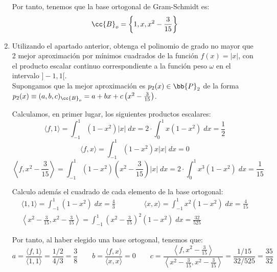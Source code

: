 \begin{ejercicio}
\begin{enumerate}
        Por tanto, tenemos que la base ortogonal de Gram-Schmidt es:
        \begin{equation*}
            \cc{B}_o = \left\{1,x,x^2 -\frac{3}{15}\right\}
        \end{equation*}

        \item Utilizando el apartado anterior, obtenga el polinomio de grado no mayor que 2 mejor aproximación por mínimos cuadrados de la función $f(x) = |x|$, con el producto escalar continuo correspondiente a la función peso $\omega$ en el intervalo $]-1, 1[$.\\

        Supongamos que la mejor aproximación es $p_2(x)\in \bb{P}_2$ de la forma $p_2(x)\equiv(a,b,c)_{\cc{B}_o} = a+bx +c\left(x^2-\frac{3}{15}\right)$.

        Calculamos, en primer lugar, los siguientes productos escalares:
        \begin{equation*}
            \langle f,1\rangle
            = \int_{-1}^1 (1-x^2)|x|\;dx
            = 2\cdot \int_{0}^1 x(1-x^2)\;dx
            = \frac{1}{2}
        \end{equation*}
        \begin{equation*}
            \langle f,x\rangle
            = \int_{-1}^1 (1-x^2)x|x|\;dx
            = 0
        \end{equation*}
        \begin{equation*}
            \left\langle f,x^2-\frac{3}{15}\right\rangle
            = \int_{-1}^1 (1-x^2)\left(x^2-\frac{3}{15}\right)|x|\;dx
            = 2\cdot\int_{0}^1 x^3(1-x^2)\;dx
            = \frac{1}{15}
        \end{equation*}

        Calculo además el cuadrado de cada elemento de la base ortogonal:
        \begin{gather*}
            \langle 1,1\rangle
            = \int_{-1}^1 (1-x^2)\;dx
            = \frac{4}{3}
            \qquad \qquad
            \langle x,x\rangle
            = \int_{-1}^1 x^2(1-x^2)\;dx
            = \frac{4}{15}
            \\
            \left\langle x^2 -\frac{3}{15},x^2 -\frac{3}{15}\right\rangle
            = \int_{-1}^1 \left(x^2 -\frac{3}{15}\right)^2 (1-x^2)\;dx
            = \frac{32}{525}
        \end{gather*}

        Por tanto, al haber elegido una base ortogonal, tenemos que:
        \begin{equation*}
            a = \frac{\langle f,1\rangle}{\langle 1,1\rangle} = \frac{1/2}{4/3} = \frac{3}{8}
            \qquad
            b = \frac{\langle f,x\rangle}{\langle x,x\rangle} = 0
            \qquad
            c = \frac{\left\langle f,x^2-\frac{3}{15}\right\rangle}{\left\langle x^2-\frac{3}{15},x^2-\frac{3}{15}\right\rangle} = \frac{1/15}{32/525} = \frac{35}{32}
        \end{equation*}


\end{enumerate}
\end{ejercicio}
